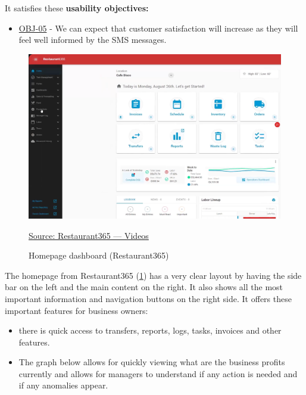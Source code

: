 \documentclass[]{VUMIFTemplateClass}
\begin{document}
It satisfies these \textbf{usability objectives:}

\begin{itemize}
    \item \hyperref[OBJ-05]{OBJ-05} - We can expect that customer satisfaction will increase as they will feel well informed by the SMS messages. 
\end{itemize}



\begin{figure}[H]
    \centering
    \includegraphics[width=\textwidth]{images/examples/homepage_r365.png}
    \caption{Homepage dashboard (Restaurant365)}
    \href{https://www.restaurant365.com/resource-category/videos/}{Source: Restaurant365 — Videos}
    \label{fig:homapage-dashboard}
\end{figure}


The homepage from Restaurant365 (\ref{fig:homapage-dashboard}) has a very clear
layout by having the side bar on the left and the main content on the right. It
also shows all the most important information and navigation buttons on the
right side. It offers these important features for business owners: 

\begin{itemize}
    \item there is quick access to transfers, reports, logs, tasks, invoices and other features.
    \item The graph below allows for quickly viewing what are the business profits currently and allows for managers to understand if any action is needed and if any anomalies appear.
\end{itemize}
\end{document}
